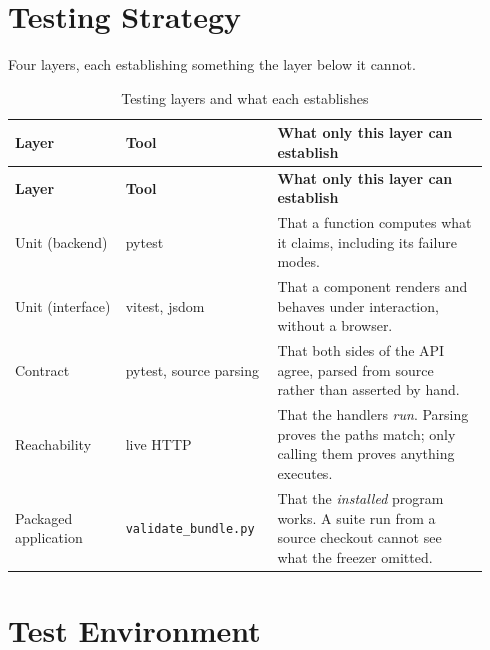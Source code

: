 \documentclass[12pt,a4paper]{report}
\begin{document}
\section{Testing Strategy}

Four layers, each establishing something the layer below it cannot.

\begin{longtable}{@{}p{0.22\linewidth}p{0.30\linewidth}p{0.42\linewidth}@{}}
\caption{Testing layers and what each establishes}\label{tab:strategy}\\
\toprule
\textbf{Layer} & \textbf{Tool} & \textbf{What only this layer can establish} \\
\midrule
\endfirsthead
\toprule
\textbf{Layer} & \textbf{Tool} & \textbf{What only this layer can establish} \\
\midrule
\endhead

Unit (backend) & pytest & That a function computes what it claims, including
  its failure modes. \\
\addlinespace
Unit (interface) & vitest, jsdom & That a component renders and behaves under
  interaction, without a browser. \\
\addlinespace
Contract & pytest, source parsing & That both sides of the API agree,
  parsed from source rather than asserted by hand. \\
\addlinespace
Reachability & live HTTP & That the handlers \emph{run}. Parsing proves the
  paths match; only calling them proves anything executes. \\
\addlinespace
Packaged application & \texttt{validate\_bundle.py} & That the \emph{installed}
  program works. A suite run from a source checkout cannot see what the
  freezer omitted. \\
\bottomrule
\end{longtable}


\section{Test Environment}
\end{document}
